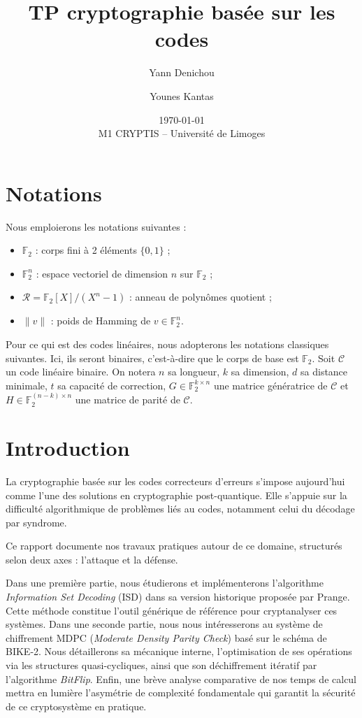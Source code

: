 \documentclass[11pt,a4paper]{article}
\title{TP cryptographie basée sur les codes}
\author{Yann Denichou \and Younes Kantas}
\date{\today\\[1em]M1 CRYPTIS -- Université de Limoges}
\newcommand{\F}{\mathbb{F}_2}
\newcommand{\Code}{\mathcal{C}}
\newcommand{\R}{\mathcal{R}}
\newcommand{\hw}[1]{\lVert#1\rVert}
\DeclareMathOperator{\rot}{rot}
\begin{document}
\maketitle

\tableofcontents
\newpage

\section*{Notations}

Nous emploierons les notations suivantes :
\begin{itemize}
    \item $\F$ : corps fini à 2 éléments $\{0, 1\}$ ;
    \item $\F^n$ : espace vectoriel de dimension $n$ sur $\F$ ;
    \item $\R = \F[X]/(X^n - 1)$ : anneau de polynômes quotient ;
    \item $\hw{v}$ : poids de Hamming de $v \in \F^n$.
\end{itemize}

Pour ce qui est des codes linéaires, nous adopterons les notations classiques
suivantes.
Ici, ils seront binaires, c'est-à-dire que le corps de base est $\F$.
Soit $\Code$ un code linéaire binaire.
On notera $n$ sa longueur, $k$ sa dimension, $d$ sa distance minimale, $t$ sa
capacité de correction,
$G \in \F^{k \times n}$ une matrice génératrice de $\Code$ et
$H \in \F^{(n - k) \times n}$ une matrice de parité de $\Code$.

\section{Introduction}

La cryptographie basée sur les codes correcteurs d'erreurs s'impose aujourd'hui
comme l'une des solutions en cryptographie post-quantique.
Elle s'appuie sur la difficulté algorithmique de problèmes liés au codes,
notamment celui du décodage par syndrome.

Ce rapport documente nos travaux pratiques autour de ce domaine, structurés
selon deux axes : l'attaque et la défense. 

Dans une première partie, nous étudierons et implémenterons l'algorithme
\emph{Information Set Decoding} (ISD) dans sa version historique proposée par
Prange. Cette méthode constitue l'outil générique de référence pour
cryptanalyser ces systèmes. 
Dans une seconde partie, nous nous intéresserons au système de chiffrement MDPC
(\emph{Moderate Density Parity Check}) basé sur le schéma de BIKE-2.
Nous détaillerons sa mécanique interne, l'optimisation de ses opérations via les
structures quasi-cycliques, ainsi que son déchiffrement itératif par
l'algorithme \emph{BitFlip}. 
Enfin, une brève analyse comparative de nos temps de calcul mettra en lumière
l'asymétrie de complexité fondamentale qui garantit la sécurité de ce
cryptosystème en pratique.
\end{document}
